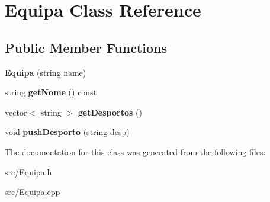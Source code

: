 \hypertarget{class_equipa}{}\section{Equipa Class Reference}
\label{class_equipa}
\subsection*{Public Member Functions}
\begin{DoxyCompactItemize}
\item 
\hypertarget{class_equipa_aff6ca66d2a63c796afdb807622876235}{}{\bfseries Equipa} (string name)\label{class_equipa_aff6ca66d2a63c796afdb807622876235}

\item 
\hypertarget{class_equipa_a9d20d0c8daa94e7562c5ea173337a224}{}string {\bfseries get\+Nome} () const \label{class_equipa_a9d20d0c8daa94e7562c5ea173337a224}

\item 
\hypertarget{class_equipa_a478806e57983511d7b44f4f69f80d28a}{}vector$<$ string $>$ {\bfseries get\+Desportos} ()\label{class_equipa_a478806e57983511d7b44f4f69f80d28a}

\item 
\hypertarget{class_equipa_a91e981a8a48f41460d14969d25142706}{}void {\bfseries push\+Desporto} (string desp)\label{class_equipa_a91e981a8a48f41460d14969d25142706}

\end{DoxyCompactItemize}


The documentation for this class was generated from the following files\+:\begin{DoxyCompactItemize}
\item 
src/Equipa.\+h\item 
src/Equipa.\+cpp\end{DoxyCompactItemize}
